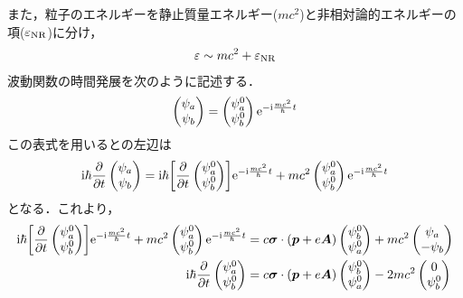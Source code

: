 \documentclass{report}
\begin{document}
また，粒子のエネルギーを静止質量エネルギー($mc^2$)と非相対論的エネルギーの項($\varepsilon_{\mathrm{NR}}$)に分け，
\begin{align}
  \varepsilon \sim mc^2 + \varepsilon_{\mathrm{NR}}
\end{align}
波動関数の時間発展を次のように記述する．
\begin{align}
  \begin{pmatrix}
    \psi_a\\
    \psi_b
  \end{pmatrix}
  =
  \begin{pmatrix}
    \psi_a^0\\
    \psi_b^0
  \end{pmatrix}
  \mathrm{e}^{-\mathrm{i} \frac{mc^2}{\hbar}t}
\end{align}
この表式を用いるとの左辺は
\begin{align}
  \mathrm{i}\hbar \frac{\partial}{\partial t}
  \begin{pmatrix}
    \psi_a\\
    \psi_b
  \end{pmatrix}
  =
  \mathrm{i}\hbar\qty[
    \frac{\partial}{\partial t}
    \begin{pmatrix}
      \psi_a^0\\
      \psi_b^0
    \end{pmatrix}
  ]
  \mathrm{e}^{-\mathrm{i}\frac{mc^2}{\hbar}t}
  + mc^2
  \begin{pmatrix}
    \psi_a^0\\
    \psi_b^0
  \end{pmatrix}
  \mathrm{e}^{-\mathrm{i}\frac{mc^2}{\hbar}t}
\end{align}
となる．これより，
\begin{align}
  \mathrm{i}\hbar\qty[
    \frac{\partial}{\partial t}
    \begin{pmatrix}
      \psi_a^0\\
      \psi_b^0
    \end{pmatrix}
  ]
  \mathrm{e}^{-\mathrm{i}\frac{mc^2}{\hbar}t}
  + mc^2
  \begin{pmatrix}
    \psi_a^0\\
    \psi_b^0
  \end{pmatrix}
  \mathrm{e}^{-\mathrm{i}\frac{mc^2}{\hbar}t}
  &=
  c\bm{\sigma}\cdot(\bm{p} + e\bm{A})
  \begin{pmatrix}
    \psi_b^0\\
    \psi_a^0
  \end{pmatrix}
  +mc^2
  \begin{pmatrix}
    \psi_a\\
    -\psi_b
  \end{pmatrix}\\
  \mathrm{i}\hbar\frac{\partial}{\partial t}
  \begin{pmatrix}
    \psi_a^0\\
    \psi_b^0
  \end{pmatrix}
  &=
  c\bm{\sigma}\cdot(\bm{p} + e\bm{A})
  \begin{pmatrix}
    \psi_b^0\\
    \psi_a^0
  \end{pmatrix}
  -2mc^2
  \begin{pmatrix}
    0\\
    \psi_b^0
  \end{pmatrix}
\end{align}
\end{document}
